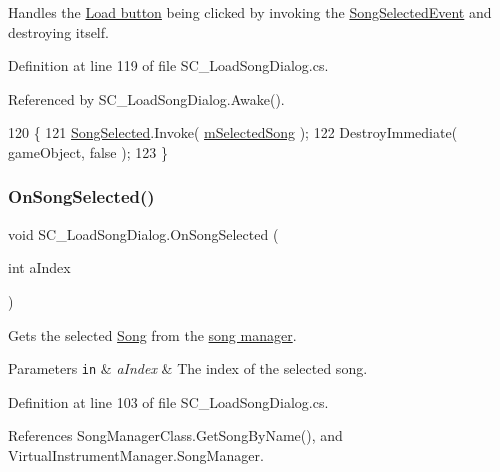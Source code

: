 Handles the \hyperlink{group___s_c___l_s_d_priv_var_gaa27cfb6231ef826024dd063828efa364}{Load button} being clicked by invoking the \hyperlink{group___s_c___l_s_d_event_types_class_s_c___load_song_dialog_1_1_song_selected_event}{Song\+Selected\+Event} and destroying itself. 



Definition at line 119 of file S\+C\+\_\+\+Load\+Song\+Dialog.\+cs.



Referenced by S\+C\+\_\+\+Load\+Song\+Dialog.\+Awake().


\begin{DoxyCode}
120     \{
121         \hyperlink{group___s_c___l_s_d_events_ga48d606b2c8291fee822dcc2b14ddcecc}{SongSelected}.Invoke( \hyperlink{group___s_c___l_s_d_priv_var_ga007db4c9493497f21fb518ab676226a4}{mSelectedSong} );
122         DestroyImmediate( gameObject, \textcolor{keyword}{false} );
123     \}
\end{DoxyCode}
\mbox{\label{group___s_c___l_s_d_handlers_gacbe31698637339188fd50ba1a6723eab}} 
\subsubsection{\texorpdfstring{On\+Song\+Selected()}{OnSongSelected()}}
{\footnotesize\ttfamily void S\+C\+\_\+\+Load\+Song\+Dialog.\+On\+Song\+Selected (\begin{DoxyParamCaption}\item[{int}]{a\+Index }\end{DoxyParamCaption})\hspace{0.3cm}{\ttfamily [private]}}



Gets the selected \hyperlink{class_song}{Song} from the \hyperlink{class_song_manager_class}{song manager}. 


\begin{DoxyParams}[1]{Parameters}
\mbox{\tt in}  & {\em a\+Index} & The index of the selected song. \\
\hline
\end{DoxyParams}


Definition at line 103 of file S\+C\+\_\+\+Load\+Song\+Dialog.\+cs.



References Song\+Manager\+Class.\+Get\+Song\+By\+Name(), and Virtual\+Instrument\+Manager.\+Song\+Manager.



